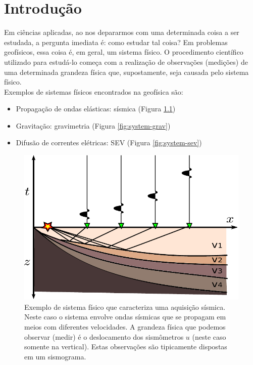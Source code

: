 \chapter{Introdução}
\label{chap:intro}

\indent Em ciências aplicadas, ao nos depararmos com uma determinada coisa a ser
estudada, a pergunta imediata é: como estudar tal coisa? Em problemas geofísicos,
essa coisa é, em geral, um sistema físico. O procedimento científico utilizado
para estudá-lo começa com a realização de observações (medições) de uma
determinada grandeza física que, supostamente, seja causada pelo sistema físico.
\\
\indent Exemplos de sistemas físicos encontrados na geofísica são:

\begin{itemize}
    \item{Propagação de ondas elásticas: sísmica (Figura \ref{fig:system-seismic})}
    \item{Gravitação: gravimetria (Figura \ref{fig:system-grav})}
    \item{Difusão de correntes elétricas: SEV (Figura \ref{fig:system-sev})}
\end{itemize}

\begin{figure}
    \centering
    \includegraphics[scale=1]{figs/system-seismic}
    \caption{Exemplo de sistema físico que caracteriza uma aquisição sísmica.
        Neste caso o sistema envolve ondas sísmicas que se propagam em meios com
        diferentes velocidades. A grandeza física que podemos observar (medir)
        é o deslocamento dos sismômetros $u$ (neste caso somente na vertical).
        Estas observações são tipicamente dispostas em um sismograma.}
    \label{fig:system-seismic}
\end{figure}

